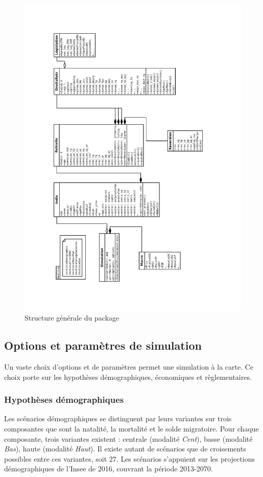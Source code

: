\begin{landscape}
\begin{figure}
\caption{Structure générale du package}
\label{fig:structGenePack}
\includegraphics[scale=0.85,angle=270,origin=c]{Diagramme2.pdf}
\end{figure}
\end{landscape}

\subsection{Options et paramètres de simulation}
Un vaste choix d'options et de paramètres permet une simulation à la carte. Ce choix porte sur les hypothèses démographiques, économiques et règlementaires.

\subsubsection{Hypothèses démographiques}
Les scénarios démographiques se distinguent par leurs variantes sur trois composantes que sont la natalité, la mortalité et le solde migratoire. Pour chaque composante, trois variantes existent : centrale (modalité \textit{Cent}), basse (modalité \textit{Bas}), haute (modalité \textit{Haut}). Il existe autant de scénarios que de croisements possibles entre ces variantes, soit 27. Les scénarios s'appuient sur les projections démographiques de l'Insee de 2016, couvrant la période 2013-2070.

